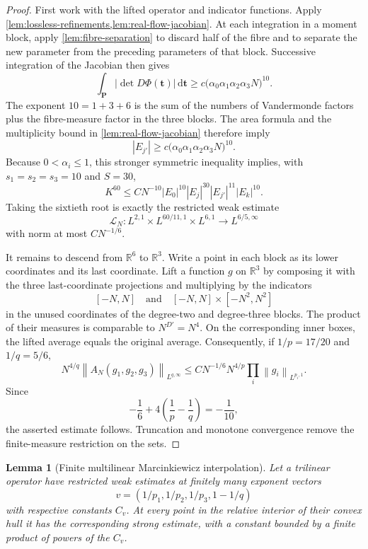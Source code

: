 \documentclass[11pt]{article}
\newtheorem{lemma}[theorem]{Lemma}
\newcommand{\R}{\mathbb{R}}
\newcommand{\dd}{\,\mathrm{d}}
\newcommand{\norm}[2]{\left\lVert #1\right\rVert_{#2}}
\newcommand{\abs}[1]{\left|#1\right|}
\begin{document}
	\begin{proof}
		First work with the lifted operator and indicator functions.  Apply
		\cref{lem:lossless-refinements,lem:real-flow-jacobian}.  At each integration in a moment block, apply \cref{lem:fibre-separation} to discard half of the fibre and to separate the new parameter from the preceding parameters of that block.  Successive integration of the Jacobian then gives
		\[
		\int_{\mathbf P}\abs{\det D\Phi(\mathbf t)}\dd\mathbf t
		\geq
		c\bigl(\alpha_0\alpha_1\alpha_2\alpha_3N\bigr)^{10}.
		\]
		The exponent \(10=1+3+6\) is the sum of the numbers of Vandermonde factors plus the fibre-measure factor in the three blocks.  The area formula and the multiplicity bound in
		\cref{lem:real-flow-jacobian} therefore imply
		\[
		\abs{E_{j'}}
		\geq c\bigl(\alpha_0\alpha_1\alpha_2\alpha_3N\bigr)^{10}.
		\]
		Because \(0<\alpha_i\leq1\), this stronger symmetric inequality implies, with
		\(s_1=s_2=s_3=10\) and \(S=30\),
		\[
		K^{60}
		\leq
		CN^{-10}\abs{E_0}^{10}\abs{E_j}^{30}
		\abs{E_{j'}}^{11}\abs{E_k}^{10}.
		\]
		Taking the sixtieth root is exactly the restricted weak estimate
		\[
		\mathcal L_N:
		L^{2,1}\times L^{60/11,1}\times L^{6,1}
		\longrightarrow L^{6/5,\infty}
		\]
		with norm at most \(CN^{-1/6}\).
		
		It remains to descend from \(\R^6\) to \(\R^3\).  Write a point in each block as its lower coordinates and its last coordinate.  Lift a function \(g\) on \(\R^3\) by composing it with the three last-coordinate projections and multiplying by the indicators
		\[
		[-N,N]\quad\text{and}\quad[-N,N]\times[-N^2,N^2]
		\]
		in the unused coordinates of the degree-two and degree-three blocks.  The product of their measures is comparable to \(N^{D'}=N^4\).  On the corresponding inner boxes, the lifted average equals the original average.  Consequently, if \(1/p=17/20\) and \(1/q=5/6\),
		\[
		N^{4/q}\norm{A_N(g_1,g_2,g_3)}{L^{q,\infty}}
		\leq
		CN^{-1/6}N^{4/p}\prod_i\norm{g_i}{L^{p_i,1}}.
		\]
		Since
		\[
		-\frac16+4\left(\frac1p-\frac1q\right)=-\frac1{10},
		\]
		the asserted estimate follows.  Truncation and monotone convergence remove the finite-measure restriction on the sets.
	\end{proof}
	
	\begin{lemma}[Finite multilinear Marcinkiewicz interpolation]\label{lem:finite-marcinkiewicz}
		Let a trilinear operator have restricted weak estimates at finitely many exponent vectors
		\[
		v=(1/p_1,1/p_2,1/p_3,1-1/q)
		\]
		with respective constants \(C_v\).  At every point in the relative interior of their convex hull it has the corresponding strong estimate, with a constant bounded by a finite product of powers of the \(C_v\).
	\end{lemma}
	
\end{document}
